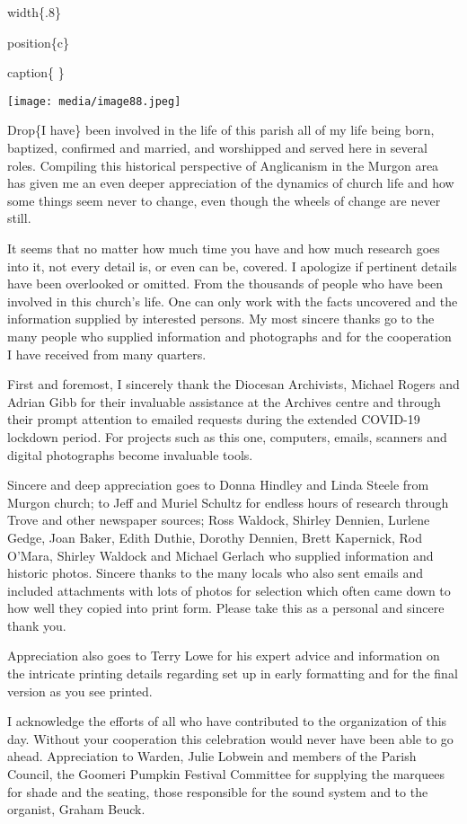 width\{.8\}

position\{c\}

caption\{ \}

\texttt{[image: media/image88.jpeg]}

Drop\{I have\} been involved in the life of this parish all of my life being born, baptized, confirmed and married, and worshipped and served here in several roles. Compiling this historical perspective of Anglicanism in the Murgon area has given me an even deeper appreciation of the dynamics of church life and how some things seem never to change, even though the wheels of change are never still.

It seems that no matter how much time you have and how much research goes into it, not every detail is, or even can be, covered. I apologize if pertinent details have been overlooked or omitted. From the thousands of people who have been involved in this church's life. One can only work with the facts uncovered and the information supplied by interested persons. My most sincere thanks go to the many people who supplied information and photographs and for the cooperation I have received from many quarters.

First and foremost, I sincerely thank the Diocesan Archivists, Michael Rogers and Adrian Gibb for their invaluable assistance at the Archives centre and through their prompt attention to emailed requests during the extended COVID-19 lockdown period. For projects such as this one, computers, emails, scanners and digital photographs become invaluable tools.

Sincere and deep appreciation goes to Donna Hindley and Linda Steele from Murgon church; to Jeff and Muriel Schultz for endless hours of research through Trove and other newspaper sources; Ross Waldock, Shirley Dennien, Lurlene Gedge, Joan Baker, Edith Duthie, Dorothy Dennien, Brett Kapernick, Rod O'Mara, Shirley Waldock and Michael Gerlach who supplied information and historic photos. Sincere thanks to the many locals who also sent emails and included attachments with lots of photos for selection which often came down to how well they copied into print form. Please take this as a personal and sincere thank you.

Appreciation also goes to Terry Lowe for his expert advice and information on the intricate printing details regarding set up in early formatting and for the final version as you see printed.

I acknowledge the efforts of all who have contributed to the organization of this day. Without your cooperation this celebration would never have been able to go ahead. Appreciation to Warden, Julie Lobwein and members of the Parish Council, the Goomeri Pumpkin Festival Committee for supplying the marquees for shade and the seating, those responsible for the sound system and to the organist, Graham Beuck.

